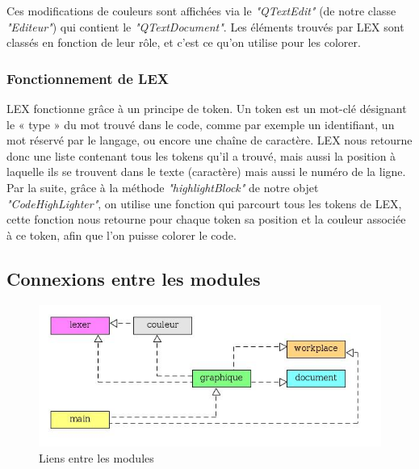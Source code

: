 \documentclass[a4paper,12pt]{article}
\begin{document}
		Ces modifications de couleurs sont affichées via le \textit{"QTextEdit"} (de notre classe \textit{"Editeur"}) qui contient le \textit{"QTextDocument"}. Les éléments trouvés par LEX sont classés en fonction de leur rôle, et c'est ce qu'on utilise pour les colorer.

		\subsubsection*{Fonctionnement de LEX}
		
	LEX fonctionne grâce à un principe de token. Un token est un mot-clé désignant le « type » du mot trouvé dans le code, comme par exemple un identifiant, un mot réservé par le langage, ou encore une chaîne de caractère. LEX nous retourne donc une liste contenant tous les tokens qu’il a trouvé, mais aussi la position à laquelle ils se trouvent dans le texte (caractère) mais aussi le numéro de la ligne.\\
	 Par la suite, grâce à la méthode \textit{"highlightBlock"} de notre objet \textit{"CodeHighLighter"}, on utilise une fonction qui parcourt tous les tokens de LEX, cette fonction nous retourne pour chaque token sa position et la couleur associée à ce token, afin que l’on puisse colorer le code.
	 
	 \subsection{Connexions entre les modules}
	 
	 \begin{figure}[h!]
			\begin{center}
				\includegraphics[scale=0.7]{images/relations_modules}
				\caption{Liens entre les modules}
			\end{center}
		\end{figure}
		
\end{document}
